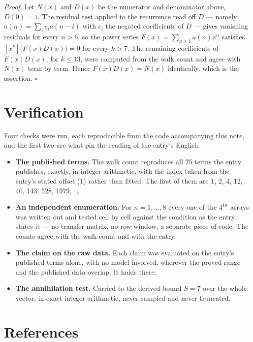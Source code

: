 \documentclass[11pt]{article}
\theoremstyle{definition}
\begin{document}
{\itshape Proof.} Let $N(x)$ and $D(x)$ be the numerator and denominator above, $D(0)=1$. The residual test applied to the recurrence read off $D$ --- namely $a(n) = \sum_i c_i a(n-i)$ with $c_i$ the negated coefficients of $D$ --- gives vanishing residuals for every $n > 6$, so the power series $F(x)=\sum_{n\ge 1}a(n)x^n$ satisfies $[x^k]\bigl(F(x)D(x)\bigr) = 0$ for every $k > 7$. The remaining coefficients of $F(x)D(x)$, for $k \le 13$, were computed from the walk count and agree with $N(x)$ term by term. Hence $F(x)D(x) = N(x)$ identically, which is the assertion. $\square$

\section{Verification}

Four checks were run, each reproducible from the code accompanying this note, and the first two are what pin the reading of the entry's English.

\begin{itemize}

\item {\bfseries The published terms.} The walk count reproduces all 25 terms the entry publishes, exactly, in integer arithmetic, with the index taken from the entry's stated offset (1) rather than fitted. The first of them are 1, 2, 4, 12, 40, 143, 528, 1979,~\dots

\item {\bfseries An independent enumeration.} For $n = 1,\dots,8$ every one of the $4^{1n}$ arrays was written out and tested cell by cell against the condition as the entry states it --- no transfer matrix, no row window, a separate piece of code. The counts agree with the walk count and with the entry.

\item {\bfseries The claim on the raw data.} Each claim was evaluated on the entry's published terms alone, with no model involved, wherever the proved range and the published data overlap. It holds there.

\item {\bfseries The annihilation test.} Carried to the derived bound $S = 7$ over the whole vector, in exact integer arithmetic, never sampled and never truncated.

\end{itemize}

\section{References}
\end{document}
